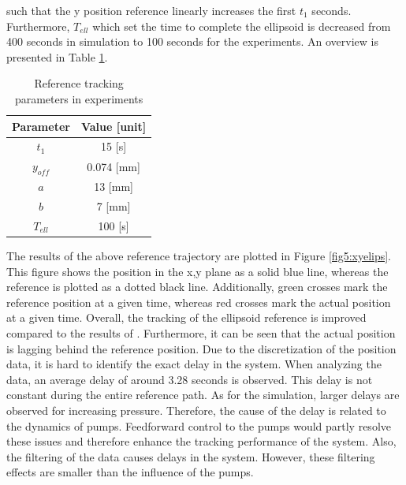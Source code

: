 such that the y position reference linearly increases the first $t_1$ seconds. Furthermore, $T_{ell}$ which set the time to complete the ellipsoid is decreased from 400 seconds in simulation to 100 seconds for the experiments. An overview is presented in Table \ref{tab5:refparams}. 


\begin{table}[H]
    \centering
    \caption{Reference tracking parameters in experiments}
    \begin{tabular}{|c|c|} \hline
   \textbf{Parameter}  & \textbf{Value [unit]} \\ \hline
    $t_1$ &   15 [s]  \\ 
    $y_{off}$ & 0.074 [mm] \\
    $a$ & 13 [mm] \\
    $b$ & 7 [mm] \\
    $T_{ell}$ & 100 [s] \\ \hline
\end{tabular}
    \label{tab5:refparams}
\end{table}

The results of the above reference trajectory are plotted in Figure \ref{fig5:xyelips}. This figure shows the position in the x,y plane as a solid blue line, whereas the reference is plotted as a dotted black line. Additionally, green crosses mark the reference position at a given time, whereas red crosses mark the actual position at a given time. Overall, the tracking of the ellipsoid reference is improved compared to the results of \cite{berkers}. Furthermore, it can be seen that the actual position is lagging behind the reference position. Due to the discretization of the position data, it is hard to identify the exact delay in the system. When analyzing the data, an average delay of around 3.28 seconds is observed.  This delay is not constant during the entire reference path. As for the simulation, larger delays are observed for increasing pressure. Therefore, the cause of the delay is related to the dynamics of pumps. Feedforward control to the pumps would partly resolve these issues and therefore enhance the tracking performance of the system. Also, the filtering of the data causes delays in the system. However, these filtering effects are smaller than the influence of the pumps. 

